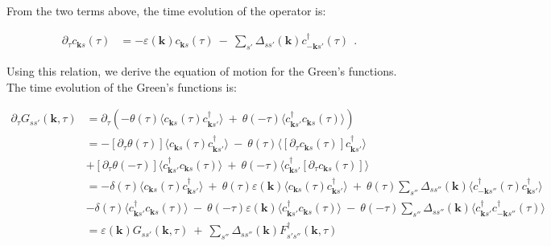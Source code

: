 \documentclass[a4j]{jsarticle}
\begin{document}
From the two terms above, the time evolution of the operator is:

\begin{align}
	\partial_{\tau}
	c_{\bm{k}s} (\tau)
	&=
	-
	\varepsilon( \bm{k} )
	c_{\bm{k} s} (\tau)
	\ - \
	\sum_{ s' }
	\Delta_{ s s' }( \bm{k} )
	c_{ - \bm{k} s'}^{\dagger} ( \tau )
	\ \ .
	\label{eqn:enzansihattenntime}
\end{align}

Using this relation, we derive the equation of motion for the Green's functions.
The time evolution of the Green's functions is:

\begin{align}
	\partial_{\tau} G_{ss'}(\bm{k} , \tau)
	&=
	\partial_{\tau}
	\left(
	-
	\theta(\tau)
	\langle c_{\bm{k}s}(\tau) c_{\bm{k} s'}^{\dagger} \rangle
	\ + \
	\theta(- \tau)
	\langle c_{\bm{k} s'}^{\dagger} c_{\bm{k}s}(\tau) \rangle
	\right)
	\nonumber \\[4mm] &=
	-
	[\partial_{\tau} \theta(\tau) ]
	\langle c_{\bm{k}s}(\tau) c_{\bm{k} s'}^{\dagger} \rangle
	\ - \
	\theta(\tau)
	\langle
	[
		\partial_{\tau}
		c_{\bm{k}s}(\tau)
	]
	c_{\bm{k} s'}^{\dagger} \rangle
	\nonumber \\[2mm] &
	+
	[\partial_{\tau} \theta(- \tau) ]
	\langle c_{\bm{k} s'}^{\dagger} c_{\bm{k}s}(\tau) \rangle
	\ + \
	\theta(- \tau)
	\langle c_{\bm{k} s'}^{\dagger}
		[
			\partial_{\tau}
			c_{\bm{k}s}(\tau)
		]
	\rangle
	\nonumber \\[4mm] &=
	-
	\delta(\tau)
	\langle c_{\bm{k}s}(\tau) c_{\bm{k} s'}^{\dagger} \rangle
	\ + \
	\theta(\tau)
	\varepsilon( \bm{k} )
	\langle
	c_{\bm{k} s} (\tau)
	c_{\bm{k} s'}^{\dagger}
	\rangle
	\ + \
	\theta(\tau)
	\sum_{ s'' }
	\Delta_{ s s'' }( \bm{k} )
	\langle
	c_{ - \bm{k} s''}^{\dagger}(\tau)
	c_{\bm{k} s'}^{\dagger}
	\rangle
	\nonumber \\[2mm] &
	-
	\delta ( \tau )
	\langle c_{\bm{k} s'}^{\dagger} c_{\bm{k}s}(\tau) \rangle
	\ - \
	\theta(- \tau)
	\varepsilon( \bm{k} )
	\langle
	c_{\bm{k} s'}^{\dagger}
	c_{\bm{k} s} (\tau)
	\rangle
	\ - \
	\theta(-\tau)
	\sum_{ s'' }
	\Delta_{ s s'' }( \bm{k} )
	\langle
	c_{\bm{k} s'}^{\dagger}
	c_{ - \bm{k} s''}^{\dagger}(\tau)
	\rangle
	\nonumber \\[2mm] &=
	\varepsilon( \bm{k} )
	G_{ss'}(\bm{k} , \tau)
	\ + \
	\sum_{s''}
	\Delta_{ s s'' }( \bm{k} )
	F_{ s' s'' }^{\dagger} ( \bm{k} , \tau)
\end{align}
\end{document}
